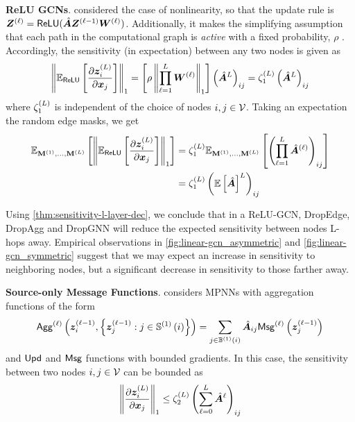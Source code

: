 \textbf{ReLU GCNs}. \citet{xu2018jknet} considered the case of  nonlinearity, so that the update rule is $\bm{Z}^{\left(\ell\right)} = \mathsf{ReLU}(\hat{\bm{A}} \bm{Z}^{\left(\ell-1\right)} \bm{W}^{\left(\ell\right)})$. Additionally, it makes the simplifying assumption that each path in the computational graph is \textit{active} with a fixed probability, $\rho$ \cite[Assumption A1p-m]{kawaguchi2016minima}. Accordingly, the sensitivity (in expectation) between any two nodes is given as
\begin{align}
    \left\|\mathbb{E}_{\mathsf{ReLU}}\left[\frac{\partial \bm{z}^{\left(L\right)}_i}{\partial \bm{x}_j}\right]\right\|_1 = \left[\rho \left\|\prod_{\ell=1}^L \bm{W}^{\left(\ell\right)}\right\|_1\right] \left(\hat{\bm{A}}^L\right)_{ij} 
    = \zeta_1^{\left(L\right)} \left(\hat{\bm{A}}^L\right)_{ij}
\end{align}
where $\zeta_1^{\left(L\right)}$ is independent of the choice of nodes $i,j\in\mathcal{V}$. Taking an expectation \wrt the random edge masks, we get
\begin{align}
    \mathbb{E}_{\mathbf{M}^{\left(1\right)}, \ldots, \mathbf{M}^{\left(L\right)}} \left[\left\|\mathbb{E}_{\mathsf{ReLU}} \left[\frac{\partial \bm{z}^{\left(L\right)}_i}{\partial \bm{x}_j}\right]\right\|_1\right]
    &=
    \zeta_1^{\left(L\right)} \mathbb{E}_{\mathbf{M}^{\left(1\right)}, \ldots, \mathbf{M}^{\left(L\right)}} \left[\left(\prod_{\ell=1}^L \hat{\bm{A}}^{\left(\ell\right)}\right)_{ij}\right] \\
    &=
    \zeta_1^{\left(L\right)} \left(\mathbb{E}\left[\hat{\bm{A}}\right]^{L}\right)_{ij}
    \label{eqn:xu}
\end{align}

Using \autoref{thm:sensitivity-l-layer-dec}, we conclude that in a ReLU-GCN, DropEdge, DropAgg and DropGNN will reduce the expected sensitivity between nodes L-hops away. Empirical observations in \autoref{fig:linear-gcn_asymmetric} and \autoref{fig:linear-gcn_symmetric} suggest that we may expect an increase in sensitivity to neighboring nodes, but a significant decrease in sensitivity to those farther away.

\textbf{Source-only Message Functions}. \citet[Lemma 3.2]{black2023resistance} considers MPNNs with aggregation functions of the form
\begin{align}
    \mathsf{Agg}^{\left(\ell\right)} \left(\bm{z}_i^{\left(\ell-1\right)}, \left\{\bm{z}_j^{\left(\ell-1\right)}: j\in\mathbb{S}^{\left(1\right)}\left(i\right)\right\}\right) =
    \sum_{j\in\mathbb{B}^{\left(1\right)}\left(i\right)} \hat{\bm{A}}_{ij} \mathsf{Msg}^{\left(\ell\right)} \left(\bm{z}_j^{\left(\ell-1\right)}\right) 
\end{align}
and $\mathsf{Upd}$ and $\mathsf{Msg}$ functions with bounded gradients. In this case, the sensitivity between two nodes $i,j\in\mathcal{V}$ %
can be bounded as
\begin{align}
    \left\|\frac{\partial \bm{z}^{\left(L\right)}_i}{\partial \bm{x}_j}\right\|_1 \leq \zeta_2^{\left(L\right)} \left(\sum_{\ell=0}^L \hat{\bm{A}}^{\ell}\right)_{ij}
\end{align}

